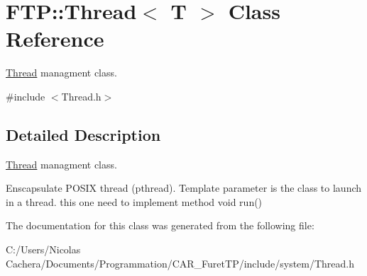 \hypertarget{classFTP_1_1Thread_3_01T_01_4}{}\section{F\+T\+P\+:\+:Thread$<$ T $>$ Class Reference}
\label{classFTP_1_1Thread_3_01T_01_4}


\hyperlink{classFTP_1_1Thread}{Thread} managment class.  




{\ttfamily \#include $<$Thread.\+h$>$}



\subsection{Detailed Description}
\hyperlink{classFTP_1_1Thread}{Thread} managment class. 

Enscapsulate P\+O\+S\+I\+X thread (pthread). Template parameter is the class to launch in a thread. this one need to implement method void run() 

The documentation for this class was generated from the following file\+:\begin{DoxyCompactItemize}
\item 
C\+:/\+Users/\+Nicolas Cachera/\+Documents/\+Programmation/\+C\+A\+R\+\_\+\+Furet\+T\+P/include/system/Thread.\+h\end{DoxyCompactItemize}
